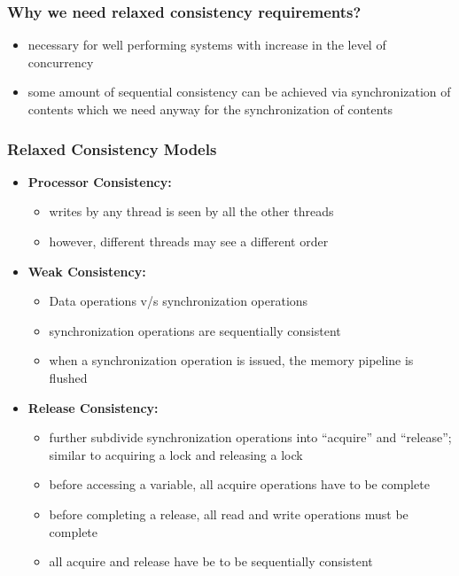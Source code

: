 \documentclass[12pt, a4paper]{report}
\begin{document}
\subsubsection{Why we need relaxed consistency requirements?}
\begin{itemize}
    \item necessary for well performing systems with increase in the level of concurrency
    \item some amount of sequential consistency can be achieved via synchronization of contents which we need anyway for the synchronization of contents
\end{itemize}

\subsubsection{Relaxed Consistency Models}
\begin{itemize}
    \item {\bfseries{Processor Consistency:}}
    \begin{itemize}
        \item writes by any thread is seen by all the other threads
        \item however, different threads may see a different order
    \end{itemize}
    \item {\bfseries{Weak Consistency:}}
    \begin{itemize}
        \item Data operations v/s synchronization operations
        \item synchronization operations are sequentially consistent
        \item when a synchronization operation is issued, the memory pipeline is flushed
    \end{itemize}
    \item {\bfseries{Release Consistency:}}
    \begin{itemize}
        \item further subdivide synchronization operations into ``acquire'' and ``release''; similar to acquiring a lock and releasing a lock
        \item before accessing a variable, all acquire operations have to be complete
        \item before completing a release, all read and write operations must be complete
        \item all acquire and release have be to be sequentially consistent
    \end{itemize}
\end{itemize}
\end{document}
